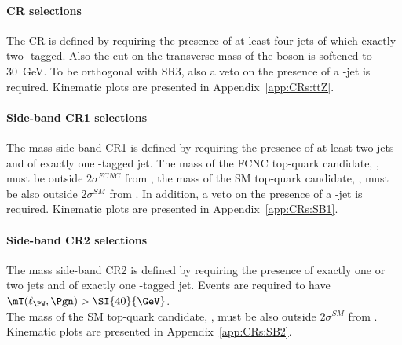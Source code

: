\paragraph{\ttZ CR selections}
\label{sec:bkg:ttz}
The \ttZ CR is defined by requiring the presence of at least four jets
of which exactly two \Pqb-tagged. Also the cut on the transverse
mass of the \PW boson is softened to \SI{30}{\GeV}. To be orthogonal 
with SR3\tZc, also a veto on the presence of a \Pqc-jet is required. 
Kinematic plots are presented in Appendix~\ref{app:CRs:ttZ}.

\paragraph{Side-band CR1 selections}
\label{sec:bkg:sbcr1tzu}
The mass side-band CR1 is defined by requiring the presence of at least two jets
and of exactly one \Pqb-tagged jet.
The mass of the FCNC top-quark candidate, \mtopfcnc,
must be outside $2\sigma^{FCNC}$ from \mtopvalue, the mass of the
SM top-quark candidate, \mtopsm, must be also outside $2\sigma^{SM}$
from \mtopvalue.  In addition, a veto on the presence of a \Pqc-jet is required. 
Kinematic plots are presented in Appendix~\ref{app:CRs:SB1}.

\paragraph{Side-band CR2 selections}
\label{sec:bkg:sbcr2}
The mass side-band CR2 is defined by requiring the presence of exactly one or two jets
and of exactly one \Pqb-tagged jet.  
Events are required to have $\mT(\ell_{\PW},\Pgn) > \SI{40}{\GeV}$.\\
The mass of the SM top-quark candidate, \mtopsm, must be also outside $2\sigma^{SM}$
from \mtopvalue. Kinematic plots are presented in Appendix~\ref{app:CRs:SB2}.

